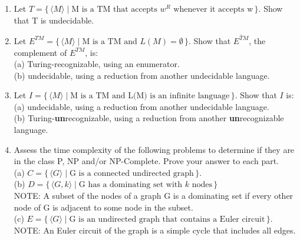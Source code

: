 \documentclass[11pt, article, oneside]{memoir}
\newcommand{\set}[1]{\{\, #1\, \}}
\begin{document}
\begin{enumerate}
    \item
    Let \(T = \set{\langle M\rangle \mid \text{M is a TM that accepts }w^R \text{ whenever it accepts w}}\). Show that T is undecidable.

    \item
    Let \(E^{TM} = \set{\langle M\rangle \mid \text{M is a TM and }L(M) = \emptyset}\). Show that \(\overline{E^{TM}}\), the complement of \(E^{TM}\), is:
    \\(a) Turing-recognizable, using an enumerator.
    \\(b) undecidable, using a reduction from another undecidable language.

    \item
    Let \(I = \set{\langle M\rangle \mid \text{M is a TM and L(M) is an infinite language}}\). Show that \(I\) is:
    \\(a) undecidable, using a reduction from another undecidable language.
    \\(b) Turing-\textbf{un}recognizable, using a reduction from another \textbf{un}recognizable language.

    \item
    Assess the time complexity of the following problems to determine if they are in the class P, NP and/or NP-Complete. Prove your answer to each part.
    \\(a) \(C = \set{\langle G\rangle \mid \text{G is a connected undirected graph}}\).
    \\(b) \(D = \set{\langle G, k\rangle \mid \text{G has a dominating set with }k\text{ nodes}}\)
    \\NOTE: A subset of the nodes of a graph G is a dominating set if every other node of G is adjacent to some node in the subset.
    \\(c) \(E = \set{\langle G\rangle \mid \text{G is an undirected graph that contains a Euler circuit}}\).
    \\NOTE: An Euler circuit of the graph is a simple cycle that includes all edges.
\end{enumerate}
\end{document}
